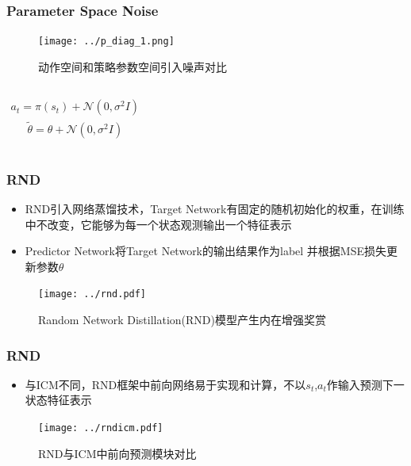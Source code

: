 \documentclass{beamer}
\begin{document}
\begin{CJK*}{GBK}{hei}
\begin{frame}\frametitle{Parameter Space Noise}
\begin{figure}[htbp]
    \centering\texttt{[image: ../p\_diag\_1.png]}
    \caption{动作空间和策略参数空间引入噪声对比\citep{Plappert2017ParameterSN}}
\end{figure}
\begin{columns}
\begin{align*}
a_{t}=\pi\left(s_{t}\right)+\mathcal{N}\left(0, \sigma^{2} I\right)
\end{align*}
\begin{align*}
\widetilde{\theta}=\theta+\mathcal{N}\left(0, \sigma^{2} I\right)
\end{align*}
\end{columns}
\end{frame}

\begin{frame}\frametitle{RND}
\begin{itemize}
\item RND\citep{Burda2019ExplorationBR}引入网络蒸馏技术，Target Network有固定的随机初始化的权重，在训练中不改变，它能够为每一个状态观测输出一个特征表示
\item Predictor Network将Target Network的输出结果作为label 并根据MSE损失更新参数$\theta$
\end{itemize}
\begin{figure}[htbp]
        \centering\texttt{[image: ../rnd.pdf]}
	    \caption{Random Network Distillation(RND)模型产生内在增强奖赏}
\end{figure}
\end{frame}

\begin{frame}\frametitle{RND}
\begin{itemize}
\item 与ICM不同，RND框架中前向网络易于实现和计算，不以$s_t$,$a_t$作输入预测下一状态特征表示
\end{itemize}
\begin{figure}[htbp]
            \centering\texttt{[image: ../rndicm.pdf]}
	    \caption{RND与ICM中前向预测模块对比}
        \end{figure}
\end{frame}


\end{CJK*}
\end{document}
